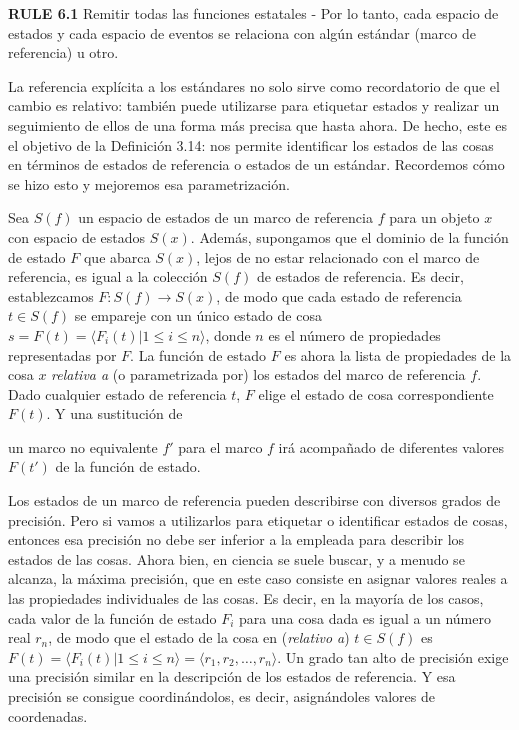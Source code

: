\begin{justifying}
\textbf{RULE 6.1} Remitir todas las funciones estatales - Por lo tanto, cada espacio de estados y cada espacio de eventos se relaciona con algún estándar (marco de referencia) u otro.

La referencia explícita a los estándares no solo sirve como recordatorio de que el cambio es relativo: también puede utilizarse para etiquetar estados y realizar un seguimiento de ellos de una forma más precisa que hasta ahora. De hecho, este es el objetivo de la Definición 3.14: nos permite identificar los estados de las cosas en términos de estados de referencia o estados de un estándar. Recordemos cómo se hizo esto y mejoremos esa parametrización.

Sea $S(f)$ un espacio de estados de un marco de referencia $f$ para un objeto $x$ con espacio de estados $S(x)$. Además, supongamos que el dominio de la función de estado $F$ que abarca $S(x)$, lejos de no estar relacionado con el marco de referencia, es igual a la colección $S(f)$ de estados de referencia. Es decir, establezcamos $F: S(f) \to S(x)$, de modo que cada estado de referencia $t \in S(f)$ se empareje con un único estado de cosa $s=F(t) = \langle F_i(t)| 1 \le i \le n \rangle$, donde $n$ es el número de propiedades representadas por $F$. La función de estado $F$ es ahora la lista de propiedades de la cosa $x$ \textit{relativa a} (o parametrizada por) los estados del marco de referencia $f$. Dado cualquier estado de referencia $t$, $F$ elige el estado de cosa correspondiente $F(t)$. Y una sustitución de

un marco no equivalente $f'$ para el marco $f$ irá acompañado de diferentes valores $F(t')$ de la función de estado.

Los estados de un marco de referencia pueden describirse con diversos grados de precisión. Pero si vamos a utilizarlos para etiquetar o identificar estados de cosas, entonces esa precisión no debe ser inferior a la empleada para describir los estados de las cosas. Ahora bien, en ciencia se suele buscar, y a menudo se alcanza, la máxima precisión, que en este caso consiste en asignar valores reales a las propiedades individuales de las cosas. Es decir, en la mayoría de los casos, cada valor de la función de estado $F_i$ para una cosa dada es igual a un número real $r_n$, de modo que el estado de la cosa en (\textit{relativo a}) $t \in S(f)$ es $F(t) = \langle F_i(t)| 1 \le i \le n \rangle = \langle r_1, r_2, \dots, r_n \rangle$. Un grado tan alto de precisión exige una precisión similar en la descripción de los estados de referencia. Y esa precisión se consigue coordinándolos, es decir, asignándoles valores de coordenadas.


\end{justifying}
